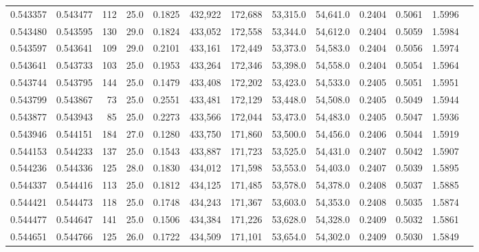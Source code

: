 \begin{tabular}{rrrrrrrrrrrrr}
0.543357 & 0.543477 &   112 & 25.0 &                                     0.1825 & 432,922 & 172,688 &  53,315.0 &  54,641.0 & 0.2404 & 0.5061 & 1.5996 \\
0.543480 & 0.543595 &   130 & 29.0 &                                     0.1824 & 433,052 & 172,558 &  53,344.0 &  54,612.0 & 0.2404 & 0.5059 & 1.5984 \\
0.543597 & 0.543641 &   109 & 29.0 &                                     0.2101 & 433,161 & 172,449 &  53,373.0 &  54,583.0 & 0.2404 & 0.5056 & 1.5974 \\
0.543641 & 0.543733 &   103 & 25.0 &                                     0.1953 & 433,264 & 172,346 &  53,398.0 &  54,558.0 & 0.2404 & 0.5054 & 1.5964 \\
0.543744 & 0.543795 &   144 & 25.0 &                                     0.1479 & 433,408 & 172,202 &  53,423.0 &  54,533.0 & 0.2405 & 0.5051 & 1.5951 \\
0.543799 & 0.543867 &    73 & 25.0 &                                     0.2551 & 433,481 & 172,129 &  53,448.0 &  54,508.0 & 0.2405 & 0.5049 & 1.5944 \\
0.543877 & 0.543943 &    85 & 25.0 &                                     0.2273 & 433,566 & 172,044 &  53,473.0 &  54,483.0 & 0.2405 & 0.5047 & 1.5936 \\
0.543946 & 0.544151 &   184 & 27.0 &                                     0.1280 & 433,750 & 171,860 &  53,500.0 &  54,456.0 & 0.2406 & 0.5044 & 1.5919 \\
0.544153 & 0.544233 &   137 & 25.0 &                                     0.1543 & 433,887 & 171,723 &  53,525.0 &  54,431.0 & 0.2407 & 0.5042 & 1.5907 \\
0.544236 & 0.544336 &   125 & 28.0 &                                     0.1830 & 434,012 & 171,598 &  53,553.0 &  54,403.0 & 0.2407 & 0.5039 & 1.5895 \\
0.544337 & 0.544416 &   113 & 25.0 &                                     0.1812 & 434,125 & 171,485 &  53,578.0 &  54,378.0 & 0.2408 & 0.5037 & 1.5885 \\
0.544421 & 0.544473 &   118 & 25.0 &                                     0.1748 & 434,243 & 171,367 &  53,603.0 &  54,353.0 & 0.2408 & 0.5035 & 1.5874 \\
0.544477 & 0.544647 &   141 & 25.0 &                                     0.1506 & 434,384 & 171,226 &  53,628.0 &  54,328.0 & 0.2409 & 0.5032 & 1.5861 \\
0.544651 & 0.544766 &   125 & 26.0 &                                     0.1722 & 434,509 & 171,101 &  53,654.0 &  54,302.0 & 0.2409 & 0.5030 & 1.5849 \\

\end{tabular}
